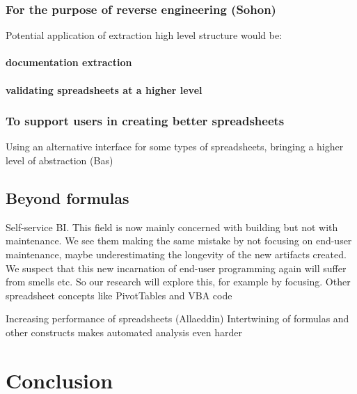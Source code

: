 \documentclass[conference]{IEEEtran}
\begin{document}
\subsubsection{For the purpose of reverse engineering (Sohon)}
Potential application of extraction high level structure would be:
\paragraph{documentation extraction}
\paragraph{validating spreadsheets at a higher level}

\subsubsection{To support users in creating better spreadsheets}
Using  an alternative interface for some types of spreadsheets, bringing a higher level of abstraction (Bas)

\subsection{Beyond formulas}

  Self-service BI. This field is now mainly concerned with building but not with maintenance. We see them making the same mistake by not focusing on end-user maintenance, maybe underestimating the longevity of the new artifacts created. We suspect that this new incarnation of end-user programming again will suffer from smells etc. So our research will explore this, for example by focusing. Other spreadsheet concepts like PivotTables and VBA code
  

Increasing performance of spreadsheets (Allaeddin)
Intertwining of formulas and other constructs makes automated analysis even harder



\section{Conclusion}













\end{document}
